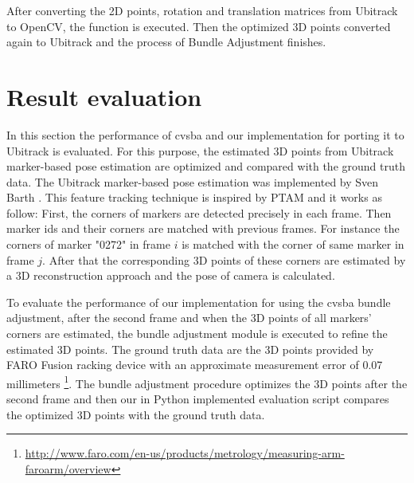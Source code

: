 After converting the 2D points, rotation and translation matrices from Ubitrack to OpenCV, the  function is executed. Then the optimized 3D points converted again to Ubitrack and the process of Bundle Adjustment finishes.\\

\section{Result evaluation}
In this section the performance of cvsba and our implementation for porting it to Ubitrack is evaluated. For this purpose, the estimated 3D points from Ubitrack marker-based pose estimation are optimized and compared with the ground truth data. The Ubitrack marker-based pose estimation was implemented by Sven Barth \cite{barth2014marker}. This feature tracking technique is inspired by PTAM \cite{klein2007parallel} and it works as follow: First, the corners of markers are detected precisely in each frame. Then marker ids and their corners are matched with previous frames. For instance the corners of marker "0272" in frame $i$ is matched with the corner of same marker in frame $j$. After that the corresponding 3D points of these corners are estimated by a 3D reconstruction approach and the pose of camera is calculated.

To evaluate the performance of our implementation for using the cvsba bundle adjustment, after the second frame and when the 3D points of all markers' corners are estimated, the bundle adjustment module is executed to refine the estimated 3D points. The ground truth data are the 3D points provided by FARO Fusion racking device with an approximate measurement error of 0.07 millimeters \footnote{\url{http://www.faro.com/en-us/products/metrology/measuring-arm-faroarm/overview}}. The bundle adjustment procedure optimizes the 3D points after the second frame and then our in Python implemented evaluation script compares the optimized 3D points with the ground truth data.

